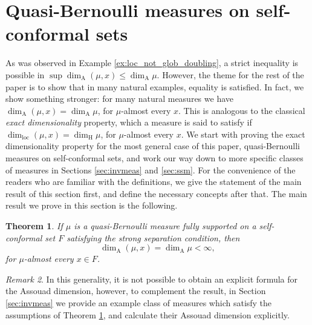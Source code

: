 \documentclass{PRM}
\newcommand{\adim}{\dim_{\mathrm{A}}}
\theoremstyle{plain}
\newtheorem{thm}{Theorem}[section]
\theoremstyle{definition}
\theoremstyle{remark}
\newtheorem{huom}[thm]{Remark}
\begin{document}
\section{Quasi-Bernoulli measures on self-conformal sets}\label{sec:qb-meas}
As was observed in Example \ref{ex:loc_not_glob_doubling}, a strict inequality is possible in $\sup\adim(\mu,x)\leq \adim\mu$. However, the theme for the rest of the paper is to show that in many natural examples, equality is satisfied. In fact, we show something stronger: for many natural measures we have $\adim(\mu,x)=\adim\mu$, for $\mu$-almost every $x$. This is analogous to the classical \emph{exact dimensionality} property, which a measure is said to satisfy if $\dim_{\mathrm{loc}}(\mu,x)=\dim_{\mathrm{H}}\mu$, for $\mu$-almost every $x$. We start with proving the exact dimensionality property for the most general case of this paper, quasi-Bernoulli measures on self-conformal sets, and work our way down to more specific classes of measures in Sections \ref{sec:invmeas} and \ref{sec:ssm}. For the convenience of the readers who are familiar with the definitions, we give the statement of the main result of this section first, and define the necessary concepts after that. The main result we prove in this section is the following.

\begin{thm}\label{thm:quasi-bernoulli-exact-assouad}
    If $\mu$ is a quasi-Bernoulli measure fully supported on a self-conformal set $F$ satisfying the strong separation condition, then
    \begin{equation*}
        \dim_{\mathrm{A}}(\mu,x)=\dim_{\mathrm{A}}\mu<\infty,
    \end{equation*}
    for $\mu$-almost every $x\in F$.
\end{thm}
\begin{huom}
    In this generality, it is not possible to obtain an explicit formula for the Assouad dimension, however, to complement the result, in Section \ref{sec:invmeas} we provide an example class of measures which satisfy the assumptions of Theorem \ref{thm:quasi-bernoulli-exact-assouad}, and calculate their Assouad dimension explicitly.
\end{huom}
\end{document}
